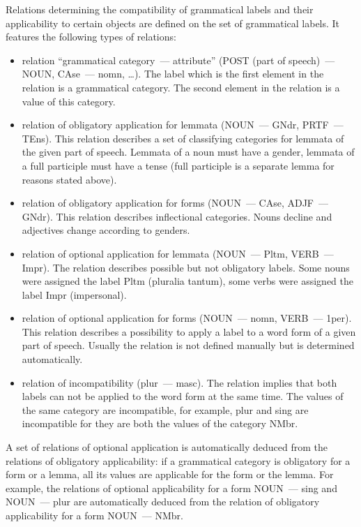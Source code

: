\documentclass[a4paper]{article}
\begin{document}
Relations determining the compatibility of grammatical labels and their applicability to certain objects are defined on the set of grammatical labels. It features the following types of relations:
\begin{itemize}
\item relation ``grammatical category~--- attribute'' (POST (part of speech)~--- NOUN, CAse~--- nomn, \ldots). The label which is the first element in the relation is a grammatical category. The second element in the relation is a value of this category.
\item relation of obligatory application for lemmata (NOUN~--- GNdr, PRTF~--- TEns). This relation describes a set of classifying categories for lemmata of the given part of speech. Lemmata of a noun must have a gender, lemmata of a full participle must have a tense (full participle is a separate lemma for reasons stated above).
\item relation of obligatory application for forms (NOUN~--- CAse, ADJF~--- GNdr). This relation describes inflectional categories. Nouns decline and adjectives change according to genders.
\item relation of optional application for lemmata (NOUN~--- Pltm, VERB~--- Impr). The relation describes possible but not obligatory labels. Some nouns were assigned the label Pltm (pluralia tantum), some verbs were assigned the label Impr (impersonal).
\item relation of optional application for forms (NOUN~--- nomn, VERB~--- 1per). This relation describes a possibility to apply a label to a word form of a given part of speech. Usually the relation is not defined manually but is determined automatically.
\item relation of incompatibility (plur~--- masc). The relation implies that both labels can not be applied to the word form at the same time. The values of the same category are incompatible, for example, plur and sing are incompatible for they are both the values of the category NMbr.
\end{itemize}

A set of relations of optional application is automatically deduced from the relations of obligatory applicability: if a grammatical category is obligatory for a form or a lemma, all its values are applicable for the form or the lemma. For example, the relations of optional applicability for a form NOUN~--- sing and NOUN~--- plur are automatically deduced from the relation of obligatory applicability for a form NOUN~--- NMbr.
\end{document}
